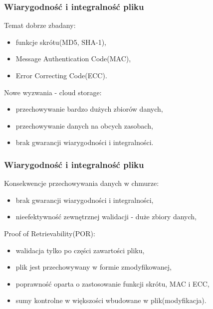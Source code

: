 \documentclass{beamer}
\begin{document}

\begin{frame}
\frametitle{Wiarygodność i integralność pliku}

\begin{block}{Temat dobrze zbadany:}
\begin{itemize}
	\item funkcje skrótu(MD5, SHA-1),
	\item Message Authentication Code(MAC),
	\item Error Correcting Code(ECC).
\end{itemize}
\end{block}

\begin{block}{Nowe wyzwania - cloud storage:}
\begin{itemize}
	\item przechowywanie bardzo dużych zbiorów danych,
	\item przechowywanie danych na obcych zasobach,
	\item brak gwarancji wiarygodności i integralności.
\end{itemize}
\end{block}

\end{frame}


\begin{frame}
\frametitle{Wiarygodność i integralność pliku}

\begin{block}{Konsekwencje przechowywania danych w chmurze:}
\begin{itemize}
	\item brak gwarancji wiarygodności i integralności,
	\item nieefektywność zewnętrznej walidacji - duże zbiory danych,
\end{itemize}
\end{block}

\begin{block}{Proof of Retrievability(POR):}
\begin{itemize}
	\item walidacja tylko po części zawartości pliku,
	\item plik jest przechowywany w formie zmodyfikowanej,
	\item poprawność oparta o zastosowanie funkcji skrótu, MAC i ECC,
	\item sumy kontrolne w większości wbudowane w plik(modyfikacja).
\end{itemize}
\end{block}

\end{frame}
\end{document}
